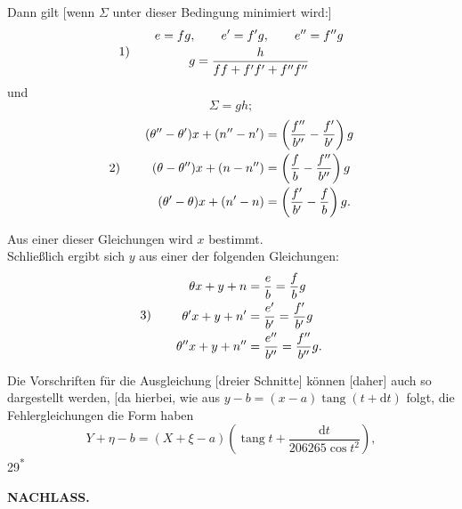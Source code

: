 Dann gilt [wenn \(\Sigma\) unter dieser Bedingung minimiert wird:]
\[
\begin{array}{@{}l@{\qquad}c@{}}
 1)&\begin{gathered}
 e=fg,\qquad e'=f'g,\qquad e''=f''g\\
 g=\frac{h}{ff+f'f'+f''f''}
 \end{gathered}
\end{array}
\]
\noindent und
\[
 \Sigma=gh;
\]
\[
\begin{array}{@{}l@{\qquad}c@{}}
 2)&\begin{aligned}
 (\theta''-\theta')x+(n''-n')&=\left(\frac{f''}{b''}-\frac{f'}{b'}\right)g\\
 (\theta-\theta'')x+(n-n'')&=\left(\frac{f}{b}-\frac{f''}{b''}\right)g\\
 (\theta'-\theta)x+(n'-n)&=\left(\frac{f'}{b'}-\frac{f}{b}\right)g.
 \end{aligned}
\end{array}
\]

Aus einer dieser Gleichungen wird \(x\) bestimmt.\\
\hspace*{\parindent}Schließlich ergibt sich \(y\) aus einer der folgenden Gleichungen:
\[
\begin{array}{@{}l@{\qquad}c@{}}
 3)&\begin{aligned}
 \theta x+y+n&=\frac{e}{b}=\frac{f}{b}g\\
 \theta'x+y+n'&=\frac{e'}{b'}=\frac{f'}{b'}g\\
 \theta''x+y+n''&=\frac{e''}{b''}=\frac{f''}{b''}g.
 \end{aligned}
\end{array}
\]

\medskip
Die Vorschriften für die Ausgleichung [dreier Schnitte] können [daher] auch so dargestellt werden, [da hierbei, wie aus \(y-b=(x-a)\operatorname{tang}(t+\mathrm{d}t)\) folgt, die Fehlergleichungen die Form haben
\[
 Y+\eta-b=(X+\xi-a)\left(\operatorname{tang}t+\frac{\mathrm{d}t}{206265\cos t^2}\right),
\]
\noindent\hfill{\small 29\textsuperscript{*}}\hspace*{.12\linewidth}\par

\par\clearpage
\noindent{}\hfill{\small\textbf{NACHLASS.}}\hfill\null\par\medskip

